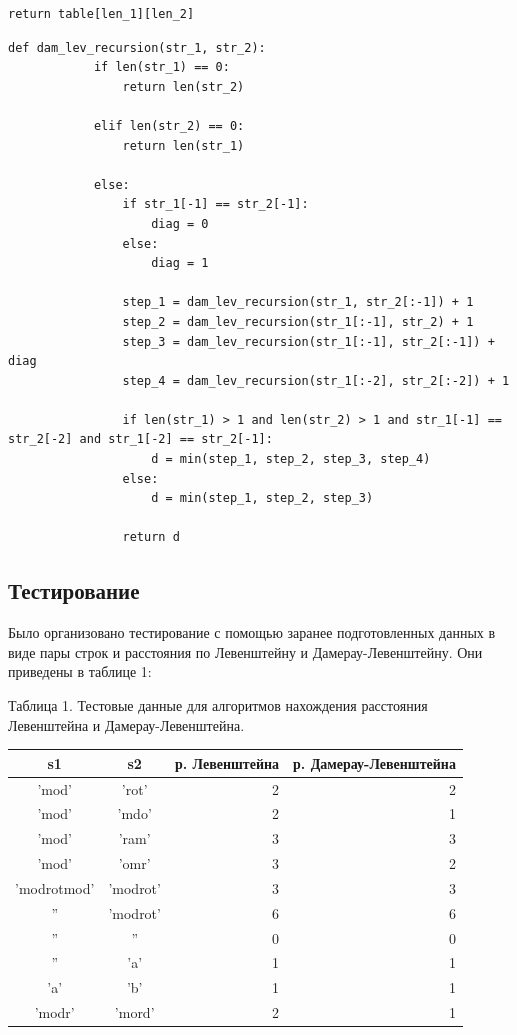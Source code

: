 \documentclass[a4paper, 14pt]{article}
\begin{document}
\begin{center}
\begin{flushleft}
\begin{lstlisting}[label=some-code,caption=Функция нахождения расстояния Дамерау-Левенштейна итеративно]
			return table[len_1][len_2]
        \end{lstlisting}
        \newpage
        \begin{lstlisting}[label=some-code,caption=Функция нахождения расстояния Дамерау-Левенштейна рекурсивно]
	def dam_lev_recursion(str_1, str_2):
			if len(str_1) == 0:
				return len(str_2)

			elif len(str_2) == 0:
				return len(str_1)

			else:
				if str_1[-1] == str_2[-1]:
					diag = 0
				else:
					diag = 1

				step_1 = dam_lev_recursion(str_1, str_2[:-1]) + 1
				step_2 = dam_lev_recursion(str_1[:-1], str_2) + 1
				step_3 = dam_lev_recursion(str_1[:-1], str_2[:-1]) + diag
				step_4 = dam_lev_recursion(str_1[:-2], str_2[:-2]) + 1

				if len(str_1) > 1 and len(str_2) > 1 and str_1[-1] == str_2[-2] and str_1[-2] == str_2[-1]:
					d = min(step_1, step_2, step_3, step_4)
				else:
					d = min(step_1, step_2, step_3)

				return d
        \end{lstlisting}
		\end{flushleft}
		
        \subsection{Тестирование}
        \begin{flushleft}
        \parindent=1cm
        Было организовано тестирование с помощью заранее подготовленных данных в виде пары строк и расстояния по Левенштейну и Дамерау-Левенштейну. Они приведены в таблице 1:\\
        	\begin{center}
  	Таблица 1. Тестовые данные для алгоритмов нахождения расстояния Левенштейна и Дамерау-Левенштейна.\\
	\end{center}
        
        \begin{tabular}{ | c | c | r | r | }
        \hline
s1 & s2 & р. Левенштейна & р. Дамерау-Левенштейна \\ \hline
'mod' & 'rot' & 2 & 2\\
'mod' & 'mdo' & 2 & 1\\
'mod' & 'ram' & 3 & 3\\
'mod' & 'omr' & 3 & 2\\
'modrotmod' & 'modrot' & 3 & 3\\
'' & 'modrot' & 6 & 6\\
'' & '' & 0 & 0\\
'' & 'a' & 1 & 1\\
'a' & 'b' & 1 & 1\\
'modr' & 'mord' & 2 & 1\\
\hline
        \end{tabular}
	

\end{flushleft}
\end{center}
\end{document}
